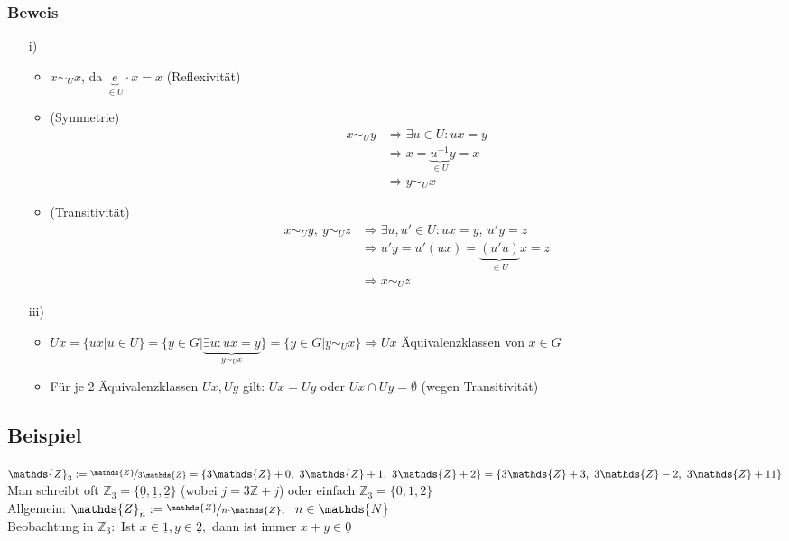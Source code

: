 \documentclass[a4paper, 12pt,titlepage, pdf, headsepline]{article}
\newcommand{\f}[2]{\nicefrac{#1}{#2}}
\newcommand{\Z}{\mathds{Z}}
\renewcommand{\>}{\rightarrow}
\renewcommand{\*}{\cdot}
\begin{document}
	      \subsubsection*{Beweis}
	      \begin{itemize}
	      	\item[i)]
	      	      \begin{itemize}
	      	      	\item $x \sim_U x$, da $\underbrace{e}_{\in U} \cdot x = x$ (Reflexivität)
	      	      	\item (Symmetrie)\begin{align*}
	      	      	      x \sim_U y &\Rightarrow \exists u \in U: ux = y\\
	      	      	      &\Rightarrow x = \underbrace{u^{-1}}_{\in U} y = x\\ &\Rightarrow y \sim_U x
	      	      	\end{align*} 
	      	      	\item  (Transitivität)\begin{align*}
	      	      	      x \sim_U y,~ y \sim_U z &\Rightarrow \exists u,u' \in U: ux = y,~ u'y = z\\& \Rightarrow u'y = u'(ux) = \underbrace{(u'u)}_{\in U}x = z \\&\Rightarrow x \sim_U z
	      	      	\end{align*}
	      	      \end{itemize}
	      	\item[iii)] 
	      	      \begin{itemize} 
	      	      	\item$Ux = \{ux | u \in U \} = \{y \in G | \underbrace{\exists u : ux = y}_{y \sim_U x} \}= \{y \in G | y \sim_U x \} \Rightarrow Ux$ Äquivalenzklassen von $x  \in G$
	      	      	\item Für je 2 Äquivalenzklassen $Ux, Uy$ gilt: $Ux = Uy$ oder $ Ux \cap Uy = \emptyset$ (wegen Transitivität)
	      	      \end{itemize} 
	      \end{itemize}
	      \subsection{Beispiel}
	      $\mathds{Z}_3 := \f{\mathds{Z}}{3\mathds{Z}} = \{3\mathds{Z} + 0,~ 3\mathds{Z} + 1, ~3\mathds{Z}  +2\}=\{3\Z+3,~3\Z-2,~3\Z+11\}$ \\
	      Man schreibt oft $\mathds{Z}_3 = \{\underline{0}, \underline{1},\underline{2}\}$ (wobei $j = 3\mathds{Z} +j$) oder einfach $\mathds{Z}_3 =\{0,1,2\}$\\
	      Allgemein: $\mathds{Z}_n := \f{\mathds{Z}}{n \cdot \mathds{Z}},~~ n \in \mathds{N}$ \\
	      Beobachtung in $\mathds{Z}_3:$ Ist $x \in \underline{1}, y \in \underline{2},$ dann ist immer $x + y \in\underline{0}$
\end{document}
